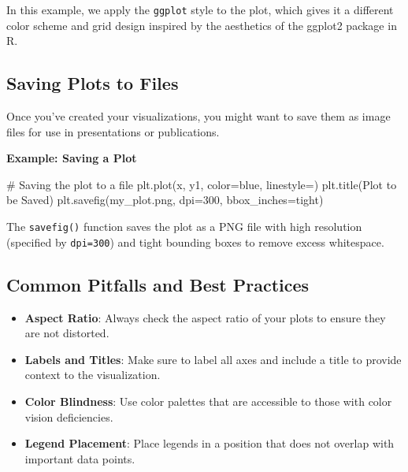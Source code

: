\documentclass[
  letterpaper,
  DIV=11,
  numbers=noendperiod]{scrreprt}
\newenvironment{Shaded}{\begin{snugshade}}{\end{snugshade}}
\newcommand{\CommentTok}[1]{\textcolor[rgb]{0.37,0.37,0.37}{#1}}
\newcommand{\DecValTok}[1]{\textcolor[rgb]{0.68,0.00,0.00}{#1}}
\newcommand{\NormalTok}[1]{\textcolor[rgb]{0.00,0.23,0.31}{#1}}
\newcommand{\OperatorTok}[1]{\textcolor[rgb]{0.37,0.37,0.37}{#1}}
\newcommand{\StringTok}[1]{\textcolor[rgb]{0.13,0.47,0.30}{#1}}
\providecommand{\tightlist}{%
  \setlength{\itemsep}{0pt}\setlength{\parskip}{0pt}}\usepackage{longtable,booktabs,array}
\begin{document}
In this example, we apply the \texttt{ggplot} style to the plot, which
gives it a different color scheme and grid design inspired by the
aesthetics of the ggplot2 package in R.

\hypertarget{saving-plots-to-files}{%
\subsection{Saving Plots to Files}\label{saving-plots-to-files}}

Once you've created your visualizations, you might want to save them as
image files for use in presentations or publications.

\textbf{Example: Saving a Plot}

\begin{Shaded}
\begin{Highlighting}[]
\CommentTok{\# Saving the plot to a file}
\NormalTok{plt.plot(x, y1, color}\OperatorTok{=}\StringTok{\textquotesingle{}blue\textquotesingle{}}\NormalTok{, linestyle}\OperatorTok{=}\StringTok{\textquotesingle{}{-}{-}\textquotesingle{}}\NormalTok{)}
\NormalTok{plt.title(}\StringTok{\textquotesingle{}Plot to be Saved\textquotesingle{}}\NormalTok{)}
\NormalTok{plt.savefig(}\StringTok{\textquotesingle{}my\_plot.png\textquotesingle{}}\NormalTok{, dpi}\OperatorTok{=}\DecValTok{300}\NormalTok{, bbox\_inches}\OperatorTok{=}\StringTok{\textquotesingle{}tight\textquotesingle{}}\NormalTok{)}
\end{Highlighting}
\end{Shaded}

The \texttt{savefig()} function saves the plot as a PNG file with high
resolution (specified by \texttt{dpi=300}) and tight bounding boxes to
remove excess whitespace.

\hypertarget{common-pitfalls-and-best-practices}{%
\subsection{Common Pitfalls and Best
Practices}\label{common-pitfalls-and-best-practices}}

\begin{itemize}
\tightlist
\item
  \textbf{Aspect Ratio}: Always check the aspect ratio of your plots to
  ensure they are not distorted.
\item
  \textbf{Labels and Titles}: Make sure to label all axes and include a
  title to provide context to the visualization.
\item
  \textbf{Color Blindness}: Use color palettes that are accessible to
  those with color vision deficiencies.
\item
  \textbf{Legend Placement}: Place legends in a position that does not
  overlap with important data points.
\end{itemize}
\end{document}
